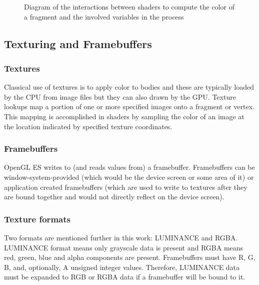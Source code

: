 \documentclass[conference]{IEEEtran}
\begin{document}
\begin{figure}[!t]
\centering
 \caption{Diagram of the interactions between shaders to compute the color of a fragment and the involved variables in the process}
 \label{fig:shader_interaction}
\end{figure}

 \subsection{Texturing and Framebuffers}
  \subsubsection{Textures}
Classical use of textures is to apply color to bodies and these are typically loaded by the CPU from image files but they can also drawn by the GPU. Texture lookups map a portion of one or more specified images onto a fragment or vertex. This mapping is accomplished in shaders by sampling the color of an image at the location indicated by specified texture coordinates. %

  \subsubsection{Framebuffers}
OpenGL ES writes to (and reads values from) a framebuffer. Framebuffers can be window-system-provided (which would be the device screen or some area of it) or application created framebuffers (which are used to write to textures after they are bound together and would not directly reflect on the device screen). %

  \subsubsection{Texture formats}
Two formats are mentioned further in this work: LUMINANCE and RGBA. LUMINANCE format means only grayscale data is present and RGBA means red, green, blue and alpha components are present. Framebuffers must have R, G, B, and, optionally, A unsigned integer values. Therefore, LUMINANCE data must be expanded to RGB or RGBA data if a framebuffer will be bound to it. %
\end{document}
